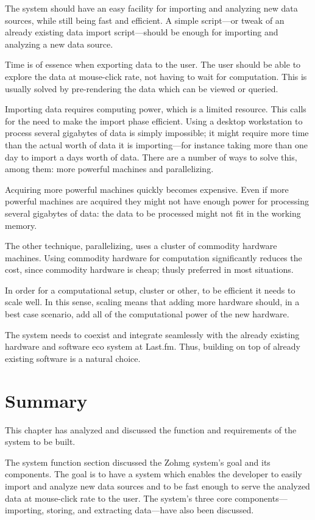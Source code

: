 The system should have an easy facility for importing and analyzing new data
sources, while still being fast and efficient. A simple script---or tweak of an
already existing data import script---should be enough for importing and
analyzing a new data source.

Time is of essence when exporting data to the user. The user should be able to
explore the data at mouse-click rate, not having to wait for computation. This
is usually solved by pre-rendering the data which can be viewed or queried.

Importing data requires computing power, which is a limited resource. This calls
for the need to make the import phase efficient. Using a desktop workstation to
process several gigabytes of data is simply impossible; it might require more
time than the actual worth of data it is importing---for instance taking more
than one day to import a days worth of data. There are a number of ways to solve
this, among them: more powerful machines and parallelizing.

Acquiring more powerful machines quickly becomes expensive. Even if more
powerful machines are acquired they might not have enough power for processing
several gigabytes of data: the data to be processed might not fit in the working
memory.

The other technique, parallelizing, uses a cluster of commodity hardware
machines. Using commodity hardware for computation significantly reduces the
cost, since commodity hardware is cheap; thusly preferred in most situations.

In order for a computational setup, cluster or other, to be efficient it needs
to scale well. In this sense, scaling means that adding more hardware should, in
a best case scenario, add all of the computational power of the new hardware.

The system needs to coexist and integrate seamlessly with the already existing
hardware and software eco system at Last.fm. Thus, building on top of already
existing software is a natural choice.


\section*{Summary}

This chapter has analyzed and discussed the function and requirements of the
system to be built.

The system function section discussed the Zohmg system's goal and its
components. The goal is to have a system which enables the developer to easily
import and analyze new data sources and to be fast enough to serve the analyzed
data at mouse-click rate to the user. The system's three core
components---importing, storing, and extracting data---have also been
discussed.


